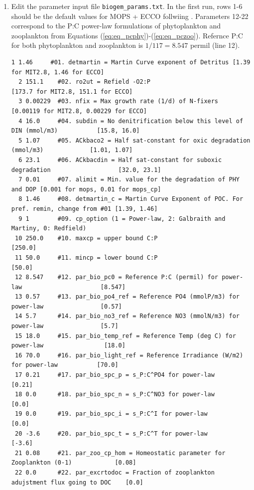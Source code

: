 \documentclass[a4paper]{article}
\begin{document}
\begin{enumerate}
\item Edit the parameter input file \verb|biogem_params.txt|. In the first run, rows 1-6 should be the default values for MOPS + ECCO follwiing \cite{Kriest20}. Parameters 12-22 correspond to the P:C power-law formulations of phytoplankton and zooplankton from Equations (\ref{eq:eq_pcphy})-(\ref{eq:eq_pczoo}). Refernce P:C for both phytoplankton and zooplankton is $1/117 = 8.547$ permil (line 12). 
\begin{lstlisting}[frame=single,basicstyle=\scriptsize,commentstyle=\color{blue}]
  1 1.46     #01. detmartin = Martin Curve exponent of Detritus [1.39 for MIT2.8, 1.46 for ECCO]
  2 151.1    #02. ro2ut = Refield -O2:P                         [173.7 for MIT2.8, 151.1 for ECCO]
  3 0.00229  #03. nfix = Max growth rate (1/d) of N-fixers      [0.00119 for MIT2.8, 0.00229 for ECCO]
  4 16.0     #04. subdin = No denitrification below this level of DIN (mmol/m3)           [15.8, 16.0]
  5 1.07     #05. ACkbaco2 = Half sat-constant for oxic degradation (mmol/m3)             [1.01, 1.07]
  6 23.1     #06. ACkbacdin = Half sat-constant for suboxic degradation                   [32.0, 23.1]
  7 0.01     #07. alimit = Min. value for the degradation of PHY and DOP [0.001 for mops, 0.01 for mops_cp]
  8 1.46     #08. detmartin_c = Martin Curve Exponent of POC. For pref. remin, change from #01 [1.39, 1.46]
  9 1        #09. cp_option (1 = Power-law, 2: Galbraith and Martiny, 0: Redfield)
 10 250.0    #10. maxcp = upper bound C:P                                                 [250.0]
 11 50.0     #11. mincp = lower bound C:P                                                 [50.0]
 12 8.547    #12. par_bio_pc0 = Reference P:C (permil) for power-law                      [8.547]
 13 0.57     #13. par_bio_po4_ref = Reference PO4 (mmolP/m3) for power-law                [0.57]
 14 5.7      #14. par_bio_no3_ref = Reference NO3 (mmolN/m3) for power-law                [5.7]
 15 18.0     #15. par_bio_temp_ref = Reference Temp (deg C) for power-law                 [18.0]
 16 70.0     #16. par_bio_light_ref = Reference Irradiance (W/m2) for power-law           [70.0]
 17 0.21     #17. par_bio_spc_p = s_P:C^PO4 for power-law                                 [0.21]
 18 0.0      #18. par_bio_spc_n = s_P:C^NO3 for power-law                                 [0.0]
 19 0.0      #19. par_bio_spc_i = s_P:C^I for power-law                                   [0.0]
 20 -3.6     #20. par_bio_spc_t = s_P:C^T for power-law                                   [-3.6]
 21 0.08     #21. par_zoo_cp_hom = Homeostatic parameter for Zooplankton (0-1)            [0.08]
 22 0.0      #22. par_excrtodoc = Fraction of zooplankton adujstment flux going to DOC    [0.0]
\end{lstlisting}


\end{enumerate}
\end{document}
